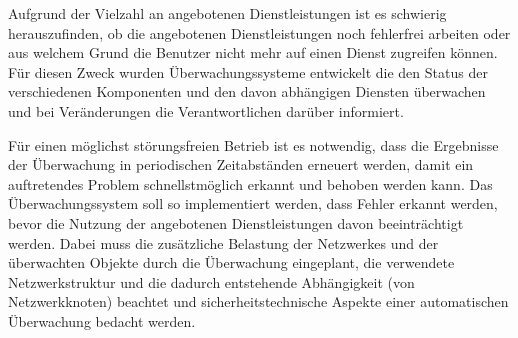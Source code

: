

Aufgrund der Vielzahl an angebotenen Dienstleistungen ist es schwierig herauszufinden, ob die angebotenen Dienstleistungen noch fehlerfrei arbeiten oder aus welchem Grund die Benutzer nicht mehr auf einen Dienst zugreifen können.
Für diesen Zweck wurden Überwachungssysteme entwickelt die den Status der verschiedenen Komponenten und den davon abhängigen Diensten überwachen und bei Veränderungen die Verantwortlichen darüber informiert.

Für einen möglichst störungsfreien Betrieb ist es notwendig, dass die Ergebnisse der Überwachung in periodischen Zeitabständen erneuert werden, damit ein auftretendes Problem schnellstmöglich erkannt und behoben werden kann.
Das Überwachungssystem soll so implementiert werden, dass Fehler erkannt werden, bevor die Nutzung der angebotenen Dienstleistungen davon beeinträchtigt werden.
Dabei muss die zusätzliche Belastung der Netzwerkes und der überwachten Objekte durch die Überwachung eingeplant, die verwendete Netzwerkstruktur und die dadurch entstehende Abhängigkeit (von Netzwerkknoten) beachtet und sicherheitstechnische Aspekte einer automatischen Überwachung bedacht werden.\\


